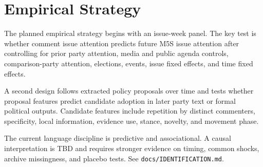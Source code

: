 \section{Empirical Strategy}\label{sec:empirical-strategy}

The planned empirical strategy begins with an issue-week panel. The key test is whether comment issue attention predicts future M5S issue attention after controlling for prior party attention, media and public agenda controls, comparison-party attention, elections, events, issue fixed effects, and time fixed effects.

A second design follows extracted policy proposals over time and tests whether proposal features predict candidate adoption in later party text or formal political outputs. Candidate features include repetition by distinct commenters, specificity, local information, evidence use, stance, novelty, and movement phase.

The current language discipline is predictive and associational. A causal interpretation is TBD and requires stronger evidence on timing, common shocks, archive missingness, and placebo tests. See \texttt{docs/IDENTIFICATION.md}.
